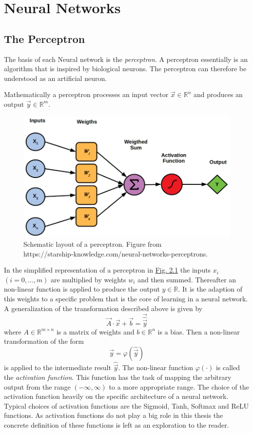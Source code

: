 \section{Neural Networks}
\subsection{The Perceptron}
The basis of each Neural network is the \textit{perceptron}. A perceptron essentially is an algorithm that is inspired by biological neurons. The perceptron can therefore be understood as an artificial neuron.

Mathematically a perceptron processes an input vector $\vec{x}\in\mathbb{R}^n$ and produces an output $\vec{y}\in\mathbb{R}^m$. 
%
\begin{figure} \label{fig:2.1}
    \centering
    \includegraphics[width=.5\textwidth]{Chapters/figures/perceptron.PNG}
    \caption[Schematic layout of a perceptron]{Schematic layout of a perceptron. Figure from\\ https://starship-knowledge.com/neural-networks-perceptrons.}
\end{figure}
%
In the simplified representation of a perceptron in \hyperref[fig:2.1]{Fig. 2.1} the inputs $x_i$ $ (i=0,\dots,m)$ are multiplied by weights $w_i$ and then summed. Thereafter an non-linear function is applied to produce the output $y\in\mathbb{R}$. It is the adaption of this weights to a specific problem that is the core of learning in a neural network. A generalization of the transformation described above is given by
%
\begin{equation} \label{equ:2.1}
    \vec{A}\cdot\vec{x}+\vec{b}=\vec{\hat{\vec{y}}}
\end{equation}
%
where $A\in\mathbb{R}^{m\times n}$ is a matrix of weights and $b\in\mathbb{R}^n$ is a bias. Then a non-linear transformation of the form
%
\begin{equation} \label{equ:2.2}
    \vec{y}=\varphi(\hat{\vec{y}})
\end{equation}
%
is applied to the intermediate result $\hat{\vec{y}}$. The non-linear function $\varphi(\cdot)$ is called the \textit{activation function}. This function has the task of mapping the arbitrary output from the range $(-\infty,\infty)$ to a more appropriate range. The choice of the activation function heavily on the specific architecture of a neural network. Typical choices of activation functions are the Sigmoid, Tanh, Softmax and ReLU functions. As activation functions do not play a big role in this thesis the concrete definition of these functions is left as an exploration to the reader.
%
